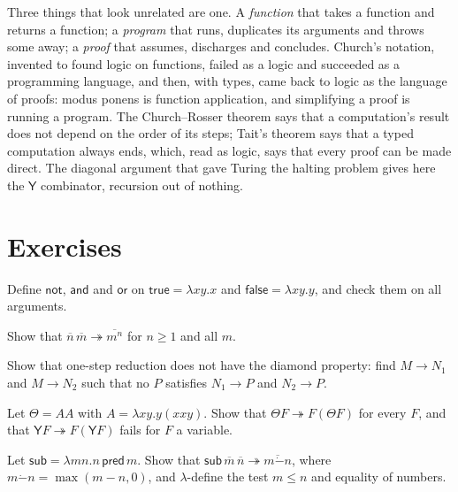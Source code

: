 \begin{beauty}
Three things that look unrelated are one. A \emph{function} that takes a function and returns a function; a \emph{program} that runs, duplicates its arguments and throws some away; a \emph{proof} that assumes, discharges and concludes. Church's notation, invented to found logic on functions, failed as a logic and succeeded as a programming language, and then, with types, came back to logic as the language of proofs: modus ponens is function application, and simplifying a proof is running a program. The Church--Rosser theorem says that a computation's result does not depend on the order of its steps; Tait's theorem says that a typed computation always ends, which, read as logic, says that every proof can be made direct. The diagonal argument that gave Turing the halting problem gives here the $\mathsf Y$ combinator, recursion out of nothing.
\end{beauty}

\section{Exercises}

\begin{exercise}[$\star$]\label{ex:booleans}
Define $\mathsf{not}$, $\mathsf{and}$ and $\mathsf{or}$ on $\mathsf{true}=\lambda xy.x$ and $\mathsf{false}=\lambda xy.y$, and check them on all arguments.
\end{exercise}

\begin{exercise}[$\star$]\label{ex:exp}
Show that $\overline n\,\overline m\twoheadrightarrow\overline{m^n}$ for $n\ge1$ and all $m$.
\end{exercise}

\begin{exercise}[$\star$]\label{ex:diamond}
Show that one-step reduction does not have the diamond property: find $M\to N_1$ and $M\to N_2$ such that no $P$ satisfies $N_1\to P$ and $N_2\to P$.
\end{exercise}

\begin{exercise}[$\star$]\label{ex:turingfix}
Let $\Theta=AA$ with $A=\lambda xy.y(xxy)$. Show that $\Theta F\twoheadrightarrow F(\Theta F)$ for every $F$, and that $\mathsf YF\twoheadrightarrow F(\mathsf YF)$ fails for $F$ a variable.
\end{exercise}

\begin{exercise}[$\star\star$]\label{ex:minus}
Let $\mathsf{sub}=\lambda mn.n\,\mathsf{pred}\,m$. Show that $\mathsf{sub}\,\overline m\,\overline n\twoheadrightarrow\overline{m\dot-n}$, where $m\dot-n=\max(m-n,0)$, and $\lambda$-define the test $m\le n$ and equality of numbers.
\end{exercise}

